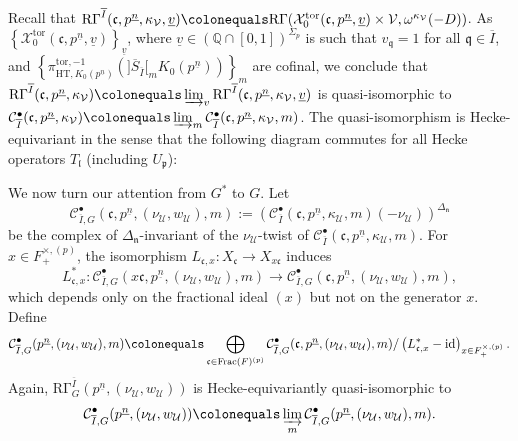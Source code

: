 \documentclass[11pt]{amsart}
\theoremstyle{definition} %
\theoremstyle{plain} %
\theoremstyle{remark} %
\newcommand{\QQ}{{\mathbb Q}}
\newcommand{\cC}{{\mathcal C}}
\newcommand{\cU}{{\mathcal U}}
\newcommand{\cV}{{\mathcal V}}
\newcommand{\cX}{{\mathcal X}}
\newcommand{\frakc}{\mathfrak c}
\newcommand{\frakl}{\mathfrak l}
\newcommand{\frakn}{\mathfrak n}
\newcommand{\frakp}{\mathfrak p}
\newcommand{\frakq}{\mathfrak q}
\newcommand{\HT}{\mathrm{HT}}
\newcommand{\defeq}{\colonequals} %
\newcommand{\tor}{\mathrm{tor}} %
\newcommand{\id}{\mathrm{id}} %
\DeclareMathOperator\Frac{Frac} %
\newcommand{\RG}{\mathrm{R\Gamma}}
\begin{document}
Recall that $\RG^{\overline{I}}(\frakc,p^{\underline{n}}, \kappa_\cV, \underline{v}) \defeq  \RG(\cX_0^\tor(\frakc,p^{\underline{n}},\underline{v})\times\cV,\omega^{\kappa_\cV}(-D))$. 
As  $\left\{\cX_0^\tor(\frakc,p^{\underline{n}},\underline{v})\right\}_{\underline{v}}$, where $\underline{v}\in(\QQ\cap[0,1])^{\Sigma_p}$ is such that $v_\frakq =1$ for all $\frakq\in \overline{I}$, and 
$\left\{\pi_{\HT, K_0(p^{\underline{n}})}^{\tor,-1}(]\overline{S}_{\overline{I}}[_m K_0(p^{\underline{n}}))\right\}_m$ 
   are cofinal,  we conclude that $\RG^{\overline{I}}(\frakc,p^{\underline{n}}, \kappa_\cV)
\defeq \varinjlim_v
\RG^{\overline{I}}(\frakc,p^{\underline{n}}, \kappa_\cV, \underline{v})$
is quasi-isomorphic to $\cC_{\overline{I}}^{\bullet}(\frakc,p^{\underline{n}}, \kappa_\cV)\defeq \varinjlim_m\cC_{\overline{I}}^{\bullet}(\frakc,p^{\underline{n}}, \kappa_\cV, m)$.
The quasi-isomorphism is Hecke-equivariant in the sense that the following diagram commutes for all Hecke operators $T_\frakl$ (including $U_\frakp$):
\begin{center}
\end{center}

We now turn our attention from $G^\ast$ to $G$.
Let  
\[\cC_{\overline{I},G}^{\bullet}(\frakc,p^{\underline{n}}, (\nu_\cU,w_\cU),m):=\left(\cC_{\overline{I}}^{\bullet}(\frakc,p^{\underline{n}}, \kappa_\cU,m)(-\nu_\cU)\right)^{\Delta_\frakn}\] be the complex of 
$\Delta_\frakn$-invariant of the $\nu_\cU$-twist of 
$\cC_{\overline{I}}^{\bullet}(\frakc,p^{\underline{n}}, \kappa_\cU,m)$. 
For $x\in F_+^{\times,(p)}$, the isomorphism $L_{\frakc,x}\colon X_{\frakc} \rightarrow X_{x\frakc}$ induces
\[
L_{\frakc,x}^\ast \colon \cC_{\overline{I},G}^{\bullet}(x\frakc,p^{\underline{n}}, (\nu_\cU,w_\cU),m) \rightarrow \cC_{\overline{I},G}^{\bullet}(\frakc,p^{\underline{n}},(\nu_\cU,w_\cU),m),
\]
which depends only on the fractional ideal $(x)$ but not on the generator $x$.
Define
\[
\cC_{\overline{I},G}^{\bullet}(p^{\underline{n}},  (\nu_\cU,w_\cU),m)\defeq
\bigoplus_{\frakc\in \Frac(F)^{(p)}}\cC_{\overline{I},G}^{\bullet}(\frakc,p^{\underline{n}}, (\nu_\cU,w_\cU),m)/\left(L_{\frakc,x}^\ast - \id\right)_{x\in F_+^{\times,(p)}}.
\] 
Again, 
$\RG_G^{\overline{I}}(p^{\underline{n}}, (\nu_\cU,w_\cU))$
is Hecke-equivariantly quasi-isomorphic to 
\[\cC_{\overline{I},G}^{\bullet}(p^{\underline{n}}, (\nu_\cU,w_\cU))\defeq \varinjlim_m\cC_{\overline{I},G}^{\bullet}(p^{\underline{n}}, (\nu_\cU,w_\cU), m).\]
\end{document}
